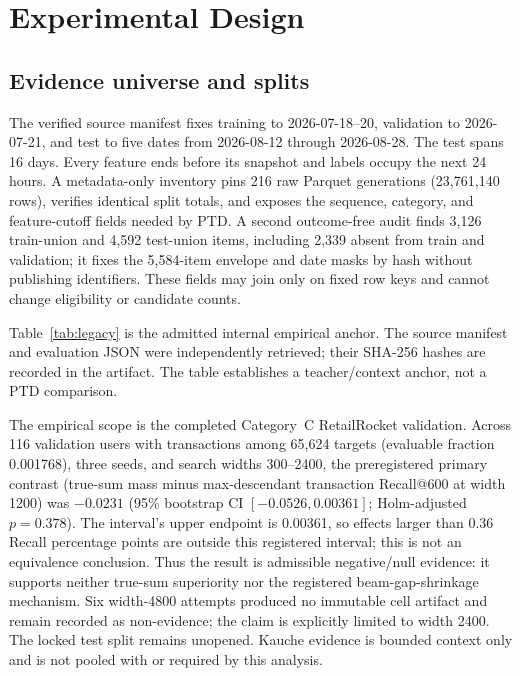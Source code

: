 \documentclass[sigconf,natbib=true]{acmart}
\begin{document}
\section{Experimental Design}
\subsection{Evidence universe and splits}
The verified source manifest fixes training to 2026-07-18--20, validation to 2026-07-21, and test to five dates from 2026-08-12 through 2026-08-28. The test spans 16 days. Every feature ends before its snapshot and labels occupy the next 24 hours. A metadata-only inventory pins 216 raw Parquet generations (23,761,140 rows), verifies identical split totals, and exposes the sequence, category, and feature-cutoff fields needed by PTD. A second outcome-free audit finds 3,126 train-union and 4,592 test-union items, including 2,339 absent from train and validation; it fixes the 5,584-item envelope and date masks by hash without publishing identifiers. These fields may join only on fixed row keys and cannot change eligibility or candidate counts.



Table~\ref{tab:legacy} is the admitted internal empirical anchor. The source manifest and evaluation JSON were independently retrieved; their SHA-256 hashes are recorded in the artifact. The table establishes a teacher/context anchor, not a PTD comparison.

The empirical scope is the completed Category~C RetailRocket validation. Across 116 validation users with transactions among 65,624 targets (evaluable fraction 0.001768), three seeds, and search widths 300--2400, the preregistered primary contrast (true-sum mass minus max-descendant transaction Recall@600 at width 1200) was $-0.0231$ (95\% bootstrap CI $[-0.0526, 0.00361]$; Holm-adjusted $p=0.378$). The interval's upper endpoint is 0.00361, so effects larger than 0.36 Recall percentage points are outside this registered interval; this is not an equivalence conclusion. Thus the result is admissible negative/null evidence: it supports neither true-sum superiority nor the registered beam-gap-shrinkage mechanism. Six width-4800 attempts produced no immutable cell artifact and remain recorded as non-evidence; the claim is explicitly limited to width 2400. The locked test split remains unopened. Kauche evidence is bounded context only and is not pooled with or required by this analysis.


\end{document}
